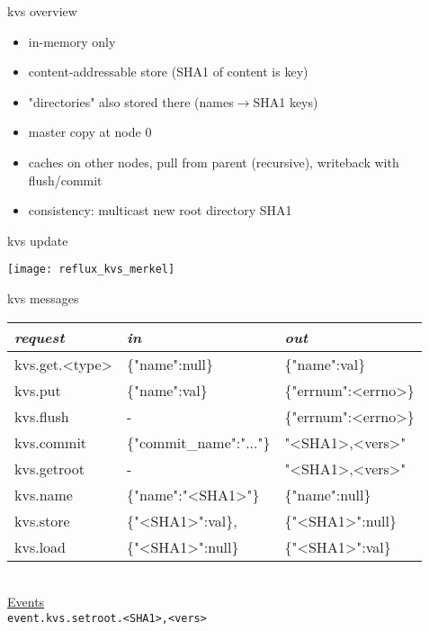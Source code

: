 \documentclass[default,pdf,colorBG,slideColor]{prosper}
\begin{document}
\begin{slide}{kvs overview}{\small
\begin{itemize}
  \item{in-memory only}
  \item{content-addressable store (SHA1 of content is key)}
  \item{"directories" also stored there (names$\rightarrow$SHA1 keys)}
  \item{master copy at node 0}
  \item{caches on other nodes, pull from parent (recursive),
        writeback with flush/commit}
  \item{consistency: multicast new root directory SHA1}
\end{itemize}
}\end{slide}

\begin{slide}{kvs update}{\small
\begin{center}
  \texttt{[image: reflux\_kvs\_merkel]}
\end{center}
}\end{slide}

\begin{slide}{kvs messages}{\tiny
\begin{tabular}{|l|l|l|}
\hline
{\em request } & {\em in } & {\em out }\\
\hline
kvs.get.<type> & \{"name":null\}
               & \{"name":val\}\\
kvs.put        & \{"name":val\}
               & \{"errnum":<errno>\}\\
kvs.flush      & -
               & \{"errnum":<errno>\}\\
kvs.commit     & \{"commit\_name":"..."\}
               & "<SHA1>,<vers>"\\
\hline
kvs.getroot    & -
               & "<SHA1>,<vers>"\\
kvs.name       & \{"name":"<SHA1>"\}
               & \{"name":null\}\\
kvs.store      & \{"<SHA1>":val\},
               & \{"<SHA1>":null\}\\
kvs.load       & \{"<SHA1>":null\}
               & \{"<SHA1>":val\}\\
\hline
\end{tabular}\\
\underline{Events}\\
{\tt event.kvs.setroot.<SHA1>,<vers>}\\
}\end{slide}
\end{document}
